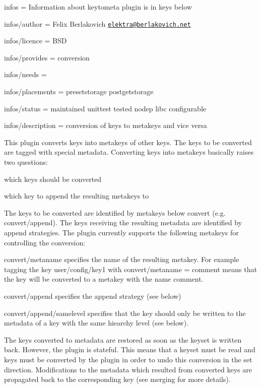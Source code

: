 
\begin{DoxyItemize}
\item infos = Information about keytometa plugin is in keys below
\item infos/author = Felix Berlakovich \href{mailto:elektra@berlakovich.net}{\tt elektra@berlakovich.\+net}
\item infos/licence = B\+S\+D
\item infos/provides = conversion
\item infos/needs =
\item infos/placements = presetstorage postgetstorage
\item infos/status = maintained unittest tested nodep libc configurable
\item infos/description = conversion of keys to metakeys and vice versa
\end{DoxyItemize}

This plugin converts keys into metakeys of other keys. The keys to be converted are tagged with special metadata. Converting keys into metakeys basically raises two questions\+:
\begin{DoxyItemize}
\item which keys should be converted
\item which key to append the resulting metakeys to
\end{DoxyItemize}

The keys to be converted are identified by metakeys below {\ttfamily convert} (e.\+g. {\ttfamily convert/append}). The keys receiving the resulting metadata are identified by append strategies. The plugin currently supports the following metakeys for controlling the conversion\+:


\begin{DoxyItemize}
\item {\ttfamily convert/metaname} specifies the name of the resulting metakey. For example tagging the key {\ttfamily user/config/key1} with {\ttfamily convert/metaname = comment} means that the key will be converted to a metakey with the name {\ttfamily comment}.
\item {\ttfamily convert/append} specifies the append strategy (see below)
\item {\ttfamily convert/append/samelevel} specifies that the key should only be written to the metadata of a key with the same hiearchy level (see below).
\end{DoxyItemize}

The keys converted to metadata are restored as soon as the keyset is written back. However, the plugin is stateful. This means that a keyset must be read and keys must be converted by the plugin in order to undo this conversion in the set direction. Modifications to the metadata which resulted from converted keys are propagated back to the corresponding key (see merging for more details).

